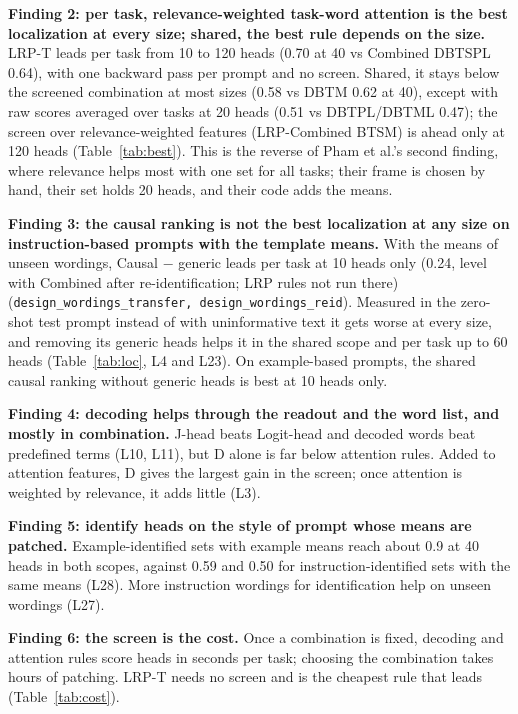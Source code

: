 \documentclass[10pt,a4paper]{article}
\newcommand{\src}[1]{{\footnotesize\textcolor{gray!60!black}{(\texttt{#1})}}}
\begin{document}
\textbf{Finding 2: per task, relevance-weighted task-word attention is the best localization at every size; shared, the best rule depends on the size.} LRP-T leads per task from 10 to 120 heads (0.70 at 40 vs Combined DBTSPL 0.64), with one backward pass per prompt and no screen. Shared, it stays below the screened combination at most sizes (0.58 vs DBTM 0.62 at 40), except with raw scores averaged over tasks at 20 heads (0.51 vs DBTPL/DBTML 0.47); the screen over relevance-weighted features (LRP-Combined BTSM) is ahead only at 120 heads (Table~\ref{tab:best}). This is the reverse of Pham et al.'s second finding, where relevance helps most with one set for all tasks; their frame is chosen by hand, their set holds 20 heads, and their code adds the means.

\textbf{Finding 3: the causal ranking is not the best localization at any size on instruction-based prompts with the template means.} With the means of unseen wordings, Causal $-$ generic leads per task at 10 heads only (0.24, level with Combined after re-identification; LRP rules not run there) \src{design\_wordings\_transfer, design\_wordings\_reid}. Measured in the zero-shot test prompt instead of with uninformative text it gets worse at every size, and removing its generic heads helps it in the shared scope and per task up to 60 heads (Table~\ref{tab:loc}, L4 and L23). On example-based prompts, the shared causal ranking without generic heads is best at 10 heads only.

\textbf{Finding 4: decoding helps through the readout and the word list, and mostly in combination.} J-head beats Logit-head and decoded words beat predefined terms (L10, L11), but D alone is far below attention rules. Added to attention features, D gives the largest gain in the screen; once attention is weighted by relevance, it adds little (L3).

\textbf{Finding 5: identify heads on the style of prompt whose means are patched.} Example-identified sets with example means reach about 0.9 at 40 heads in both scopes, against 0.59 and 0.50 for instruction-identified sets with the same means (L28). More instruction wordings for identification help on unseen wordings (L27).

\textbf{Finding 6: the screen is the cost.} Once a combination is fixed, decoding and attention rules score heads in seconds per task; choosing the combination takes hours of patching. LRP-T needs no screen and is the cheapest rule that leads (Table~\ref{tab:cost}).

\end{document}

